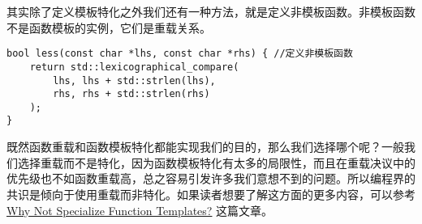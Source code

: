 其实除了定义模板特化之外我们还有一种方法，就是定义非模板函数。非模板函数不是函数模板的实例，它们是重载关系。
\begin{lstlisting}
bool less(const char *lhs, const char *rhs) { //定义非模板函数
    return std::lexicographical_compare(
        lhs, lhs + std::strlen(lhs),
        rhs, rhs + std::strlen(rhs)
    );
}
\end{lstlisting}\par
既然函数重载和函数模板特化都能实现我们的目的，那么我们选择哪个呢？一般我们选择重载而不是特化，因为函数模板特化有太多的局限性，而且在重载决议中的优先级也不如函数重载高，总之容易引发许多我们意想不到的问题。所以编程界的共识是倾向于使用重载而非特化。如果读者想要了解这方面的更多内容，可以参考 \href{http://www.gotw.ca/publications/mill17.htm}{Why Not Specialize Function Templates?} 这篇文章。\par
